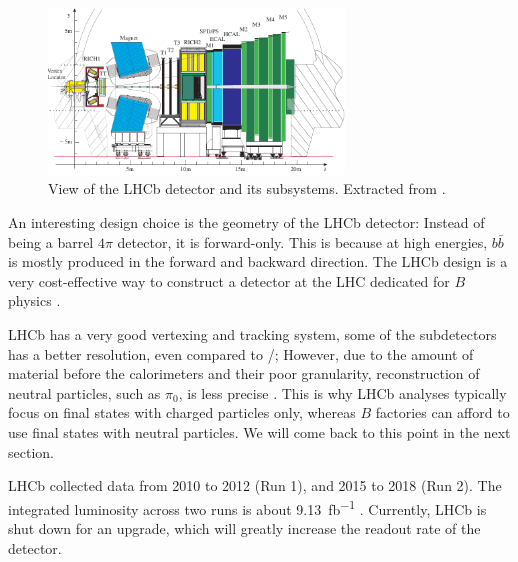\begin{figure}[ht]
    \centering
    \includegraphics[width=0.7\textwidth]{figs/lhcb_detector_view.pdf}
    \caption{
        View of the LHCb detector and its subsystems.
        Extracted from \cite{LHCb:2003ab}.
    }
    \label{fig:lhcb_detector_view}
\end{figure}

An interesting design choice is the geometry of the LHCb detector:
Instead of being a barrel $4\pi$ detector, it is forward-only.
This is because at high energies, $b\bar{b}$ is mostly produced in the forward
and backward direction.
The LHCb design is a very cost-effective way to construct a detector at the LHC
dedicated for $B$ physics \cite{LHCb:2008}.

LHCb has a very good vertexing and tracking system, some of the subdetectors has
a better resolution, even compared to \BaBar/;
However, due to the amount of material before the calorimeters and their poor granularity,
reconstruction of neutral particles, such as $\pi_0$, is less 
precise \cite{LHCb:2008,Guz:2017}.
This is why LHCb analyses typically focus on final states with charged particles
only, whereas $B$ factories can afford to use final states with neutral particles.
We will come back to this point in the next section.

LHCb collected data from 2010 to 2012 (Run 1), and 2015 to 2018 (Run 2).
The integrated luminosity across two runs is about
\SI{9.13}{fb^{-1}} \cite{LHCb-Lumi:2019}.
Currently, LHCb is shut down for an upgrade, which will greatly increase the
readout rate of the detector.


